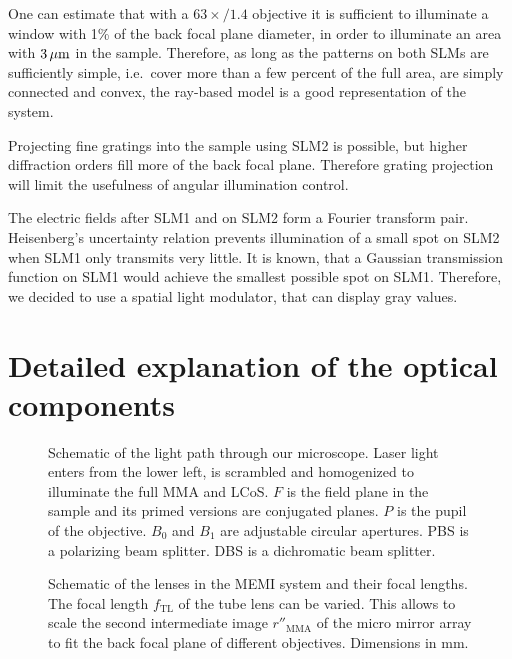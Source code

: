 One can estimate that with a $63\!\!\times\!\!/1.4$ objective it is
sufficient to illuminate a window with 1\% of the back focal plane
diameter, in order to illuminate an area with $\unit[3]{\mu m}$ in the
sample.  Therefore, as long as the patterns on both SLMs are
sufficiently simple, i.e.\ cover more than a few percent of the full
area, are simply connected and convex, %
the ray-based model is a good representation of the system.

Projecting fine gratings into the sample using SLM2 is possible, but
higher diffraction orders fill more of the back focal plane. Therefore
grating projection will limit the usefulness of angular illumination
control.

The electric fields after SLM1 and on SLM2 form a Fourier transform
pair. Heisenberg's uncertainty relation prevents illumination of a
small spot on SLM2 when SLM1 only transmits very little. It is known,
that a Gaussian transmission function on SLM1 would achieve the
smallest possible spot on SLM1. Therefore, we decided to use a spatial
light modulator, that can display gray values.

\section{Detailed explanation of the optical components}


\begin{figure}[!htbp]
  \centering
  \def\svgscale{2}
  
  \caption{Schematic of the light path through our microscope. Laser
    light enters from the lower left, is scrambled and homogenized to
    illuminate the full MMA and LCoS. $F$ is the field plane in the
    sample and its primed versions are conjugated planes. $P$ is the
    pupil of the objective. $B_0$ and $B_1$ are adjustable circular
    apertures. PBS is a polarizing beam splitter. DBS is a dichromatic
    beam splitter.}
  \label{fig:memi-real}
\end{figure}

\begin{figure}[!htbp]
   \centering
   \def\svgscale{2}
   
   \caption{Schematic of the lenses in the MEMI system and their focal
     lengths. The focal length $f_\textrm{TL}$ of the tube lens can be
     varied. This allows to scale the second intermediate image
     $r''_\textrm{MMA}$ of the micro mirror array to fit the back
     focal plane of different objectives. Dimensions in mm.}
   \label{fig:memi-sketch}
 \end{figure}
 

